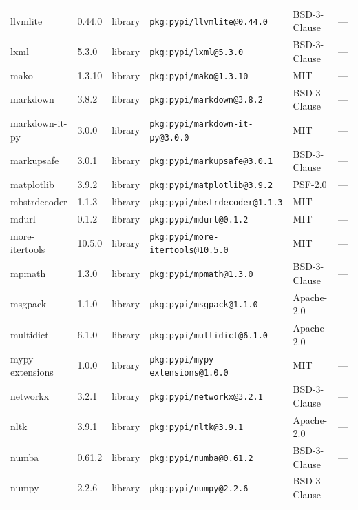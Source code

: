 \documentclass[11pt,a4paper]{article}
\begin{document}
\begin{longtable}{|p{4cm}|p{2cm}|p{1.6cm}|p{5cm}|p{1.5cm}|p{3.5cm}|}
\raggedright llvmlite & 0.44.0 & library & \small\texttt{pkg:pypi/llvmlite@0.44.0} & BSD-3-Clause & \small — \\
\raggedright lxml & 5.3.0 & library & \small\texttt{pkg:pypi/lxml@5.3.0} & BSD-3-Clause & \small — \\
\raggedright mako & 1.3.10 & library & \small\texttt{pkg:pypi/mako@1.3.10} & MIT & \small — \\
\raggedright markdown & 3.8.2 & library & \small\texttt{pkg:pypi/markdown@3.8.2} & BSD-3-Clause & \small — \\
\raggedright markdown-it-py & 3.0.0 & library & \small\texttt{pkg:pypi/markdown-it-py@3.0.0} & MIT & \small — \\
\raggedright markupsafe & 3.0.1 & library & \small\texttt{pkg:pypi/markupsafe@3.0.1} & BSD-3-Clause & \small — \\
\raggedright matplotlib & 3.9.2 & library & \small\texttt{pkg:pypi/matplotlib@3.9.2} & PSF-2.0 & \small — \\
\raggedright mbstrdecoder & 1.1.3 & library & \small\texttt{pkg:pypi/mbstrdecoder@1.1.3} & MIT & \small — \\
\raggedright mdurl & 0.1.2 & library & \small\texttt{pkg:pypi/mdurl@0.1.2} & MIT & \small — \\
\raggedright more-itertools & 10.5.0 & library & \small\texttt{pkg:pypi/more-itertools@10.5.0} & MIT & \small — \\
\raggedright mpmath & 1.3.0 & library & \small\texttt{pkg:pypi/mpmath@1.3.0} & BSD-3-Clause & \small — \\
\raggedright msgpack & 1.1.0 & library & \small\texttt{pkg:pypi/msgpack@1.1.0} & Apache-2.0 & \small — \\
\raggedright multidict & 6.1.0 & library & \small\texttt{pkg:pypi/multidict@6.1.0} & Apache-2.0 & \small — \\
\raggedright mypy-extensions & 1.0.0 & library & \small\texttt{pkg:pypi/mypy-extensions@1.0.0} & MIT & \small — \\
\raggedright networkx & 3.2.1 & library & \small\texttt{pkg:pypi/networkx@3.2.1} & BSD-3-Clause & \small — \\
\raggedright nltk & 3.9.1 & library & \small\texttt{pkg:pypi/nltk@3.9.1} & Apache-2.0 & \small — \\
\raggedright numba & 0.61.2 & library & \small\texttt{pkg:pypi/numba@0.61.2} & BSD-3-Clause & \small — \\
\raggedright numpy & 2.2.6 & library & \small\texttt{pkg:pypi/numpy@2.2.6} & BSD-3-Clause & \small — \\

\end{longtable}
\end{document}
